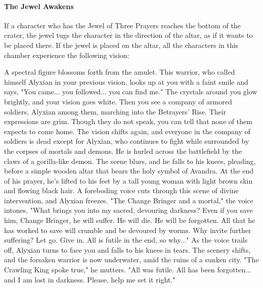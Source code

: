 \documentclass[10pt,a4,twoside,twocolumn,openany,nodeprecatedcode]{dndbook}
\begin{document}
\paragraph{The Jewel Awakens}
If a character who has the Jewel of Three Prayers reaches the bottom of the crater, the jewel tugs the character in the direction of the altar, as if it wants to be placed there. If the jewel is placed on the altar, all the characters in this chamber experience the following vision:
\begin{DndReadAloud}{}
A spectral figure blossoms forth from the amulet. This warrior, who called himself Alyxian in your previous vision, looks up at you with a faint smile and says, "You came... you followed... you can find me." The crystals around you glow brightly, and your vision goes white. Then you see a company of armored soldiers, Alyxian among them, marching into the Betrayers' Rise. Their expressions are grim. Though they do not speak, you can tell that none of them expects to come home.
The vision shifts again, and everyone in the company of soldiers is dead except for Alyxian, who continues to fight while surrounded by the corpses of mortals and demons. He is hurled across the battlefield by the claws of a gorilla-like demon. The scene blurs, and he falls to his knees, pleading, before a simple wooden altar that bears the holy symbol of Avandra. At the end of his prayer, he's lifted to his feet by a tall young woman with light brown skin and flowing black hair.
A foreboding voice cuts through this scene of divine intervention, and Alyxian freezes. "The Change Bringer and a mortal," the voice intones. "What brings you into my sacred, devouring darkness? Even if you save him, Change Bringer, he will suffer. He will die. He will be forgotten. All that he has worked to save will crumble and be devoured by worms. Why invite further suffering? Let go. Give in. All is futile in the end, so why..."
As the voice trails off, Alyxian turns to face you and falls to his knees in tears. The scenery shifts, and the forsaken warrior is now underwater, amid the ruins of a sunken city. "The Crawling King spoke true," he mutters. "All was futile. All has been forgotten... and I am lost in darkness. Please, help me set it right."
\end{DndReadAloud}
\end{document}

